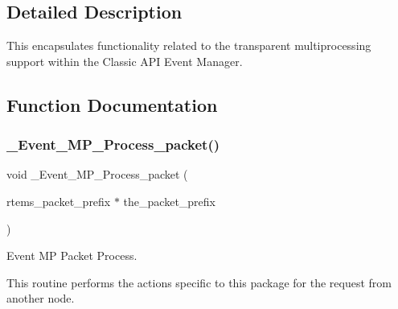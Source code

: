 \subsection{Detailed Description}
This encapsulates functionality related to the transparent multiprocessing support within the Classic A\+PI Event Manager. 

\subsection{Function Documentation}
\mbox{\label{group__ClassicEventMP_ga1874d957f7df000c20e35f8c000842d6}} 
\subsubsection{\texorpdfstring{\_Event\_MP\_Process\_packet()}{\_Event\_MP\_Process\_packet()}}
{\footnotesize\ttfamily void \+\_\+\+Event\+\_\+\+M\+P\+\_\+\+Process\+\_\+packet (\begin{DoxyParamCaption}\item[{rtems\+\_\+packet\+\_\+prefix $\ast$}]{the\+\_\+packet\+\_\+prefix }\end{DoxyParamCaption})}



Event MP Packet Process. 

This routine performs the actions specific to this package for the request from another node. 